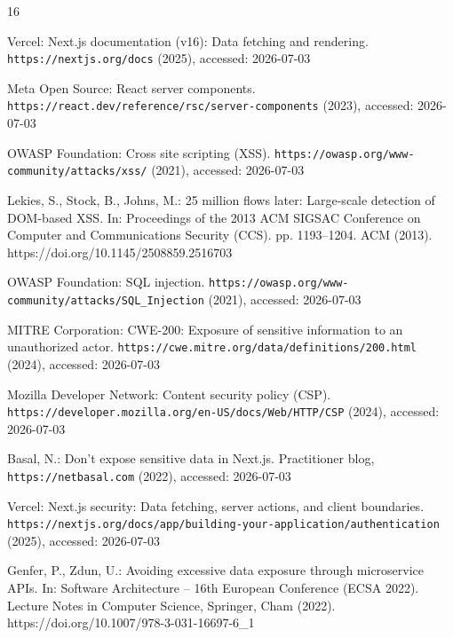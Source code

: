 \documentclass[runningheads]{llncs}
\begin{document}
\begin{thebibliography}{16}
\providecommand{\url}[1]{\texttt{#1}}
\providecommand{\urlprefix}{URL }
\providecommand{\doi}[1]{https://doi.org/#1}

{Vercel}: {Next.js} documentation (v16): Data fetching and rendering.
  \url{https://nextjs.org/docs} (2025), accessed: 2026-07-03

{Meta Open Source}: React server components.
  \url{https://react.dev/reference/rsc/server-components} (2023), accessed:
  2026-07-03

{OWASP Foundation}: Cross site scripting ({XSS}).
  \url{https://owasp.org/www-community/attacks/xss/} (2021), accessed:
  2026-07-03

Lekies, S., Stock, B., Johns, M.: 25 million flows later: Large-scale detection
  of {DOM}-based {XSS}. In: Proceedings of the 2013 ACM SIGSAC Conference on
  Computer and Communications Security (CCS). pp. 1193--1204. ACM (2013).
  \doi{10.1145/2508859.2516703}

{OWASP Foundation}: {SQL} injection.
  \url{https://owasp.org/www-community/attacks/SQL_Injection} (2021), accessed:
  2026-07-03

{MITRE Corporation}: {CWE-200}: Exposure of sensitive information to an
  unauthorized actor. \url{https://cwe.mitre.org/data/definitions/200.html}
  (2024), accessed: 2026-07-03

{Mozilla Developer Network}: Content security policy ({CSP}).
  \url{https://developer.mozilla.org/en-US/docs/Web/HTTP/CSP} (2024), accessed:
  2026-07-03

Basal, N.: Don't expose sensitive data in {Next.js}. Practitioner blog,
  \url{https://netbasal.com} (2022), accessed: 2026-07-03

{Vercel}: {Next.js} security: Data fetching, server actions, and client
  boundaries.
  \url{https://nextjs.org/docs/app/building-your-application/authentication}
  (2025), accessed: 2026-07-03

Genfer, P., Zdun, U.: Avoiding excessive data exposure through microservice
  {APIs}. In: Software Architecture -- 16th European Conference (ECSA 2022).
  Lecture Notes in Computer Science, Springer, Cham (2022).
  \doi{10.1007/978-3-031-16697-6\_1}


\end{thebibliography}
\end{document}

